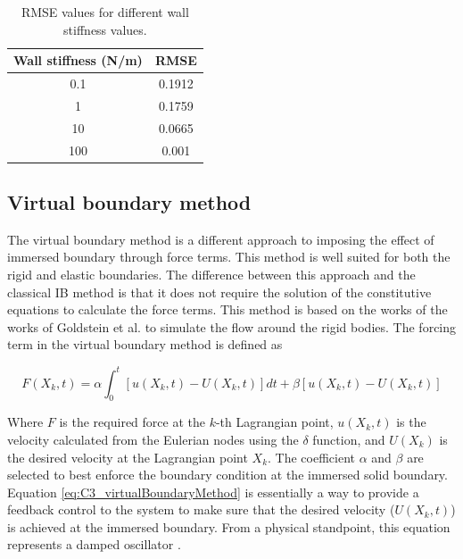 \begin{table}[H]
\centering
\begin{tabular}{c | c}
     Wall stiffness (N/m) & RMSE \\ \hline \hline
     0.1 & 0.1912 \\ \hline
     1 & 0.1759  \\ \hline
     10 & 0.0665 \\ \hline
     100 & 0.001 \\
\end{tabular}
\caption{RMSE values for different wall stiffness values.}
\label{table:C3_classicalIBResultWallStiffnessRMSE}
\end{table}

\subsection{Virtual boundary method}
The virtual boundary method is a different approach to imposing the effect of immersed boundary through force terms. This method is well suited for both the rigid and elastic boundaries. The difference between this approach and the classical IB method is that it does not require the solution of the constitutive equations to calculate the force terms. This method is based on the works of the works of Goldstein et al. \cite{goldstein1993modeling} to simulate the flow around the rigid bodies. The forcing term in the virtual boundary method is defined as

\begin{equation}\label{eq:C3_virtualBoundaryMethod}
    F(X_k, t) = 
    \alpha \int_0^t \left[ u(X_k, t) - U(X_k, t) \right] dt + 
    \beta \left[ u(X_k, t) - U(X_k, t) \right]
\end{equation}

Where $F$ is the required force at the $k$-th Lagrangian point, $u(X_k, t)$ is the velocity calculated from the Eulerian nodes using the $\delta$ function, and $U(X_k)$ is the desired velocity at the Lagrangian point $X_k$. The coefficient $\alpha$ and $\beta$ are selected to best enforce the boundary condition at the immersed solid boundary. Equation \eqref{eq:C3_virtualBoundaryMethod} is essentially a way to provide a feedback control to the system to make sure that the desired velocity ($U(X_k, t)$) is achieved at the immersed boundary. From a physical standpoint, this equation represents a damped oscillator \cite{iaccarino2003immersed}.


